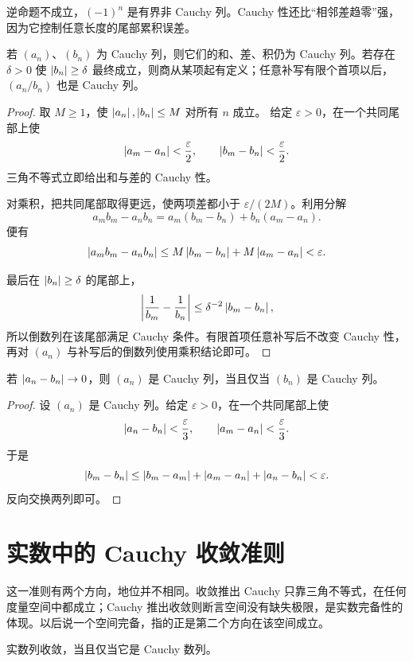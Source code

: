逆命题不成立，\((-1)^n\) 是有界非 Cauchy 列。Cauchy 性还比“相邻差趋零”强，因为它控制任意长度的尾部累积误差。

\begin{proposition}
若 \((a_n)\)、\((b_n)\) 为 Cauchy 列，则它们的和、差、积仍为 Cauchy 列。若存在 \(\delta>0\) 使
\(\left|b_n\right|\ge\delta\) 最终成立，则商从某项起有定义；任意补写有限个首项以后，\((a_n/b_n)\) 也是 Cauchy 列。
\end{proposition}

\begin{proof}
取 \(M\ge1\)，使 \(\left|a_n\right|,\left|b_n\right|\le M\) 对所有 \(n\) 成立。
给定 \(\varepsilon>0\)，在一个共同尾部上使
\[
 \left|a_m-a_n\right|<\frac{\varepsilon}{2},
 \qquad
 \left|b_m-b_n\right|<\frac{\varepsilon}{2}.
\]
三角不等式立即给出和与差的 Cauchy 性。

对乘积，把共同尾部取得更远，使两项差都小于
\(\varepsilon/(2M)\)。利用分解
\[
 a_mb_m-a_nb_n=a_m(b_m-b_n)+b_n(a_m-a_n).
\]
便有
\[
 \left|a_mb_m-a_nb_n\right|
 \le M\left|b_m-b_n\right|+M\left|a_m-a_n\right|<\varepsilon.
\]

最后在 \(\left|b_n\right|\ge\delta\) 的尾部上，
\[
 \left|\frac1{b_m}-\frac1{b_n}\right|
 \le\delta^{-2}\left|b_m-b_n\right|,
\]
所以倒数列在该尾部满足 Cauchy 条件。有限首项任意补写后不改变
Cauchy 性，再对 \((a_n)\) 与补写后的倒数列使用乘积结论即可。
\end{proof}

\begin{proposition}
若 \(\left|a_n-b_n\right|\to0\)，则 \((a_n)\) 是 Cauchy 列，当且仅当
\((b_n)\) 是 Cauchy 列。
\end{proposition}

\begin{proof}
设 \((a_n)\) 是 Cauchy 列。给定 \(\varepsilon>0\)，在一个共同尾部上使
\[
 \left|a_n-b_n\right|<\frac{\varepsilon}{3},
 \qquad
 \left|a_m-a_n\right|<\frac{\varepsilon}{3}.
\]
于是
\[
 \left|b_m-b_n\right|
 \le\left|b_m-a_m\right|+\left|a_m-a_n\right|+\left|a_n-b_n\right|
 <\varepsilon.
\]
反向交换两列即可。
\end{proof}

\section{实数中的 Cauchy 收敛准则}

这一准则有两个方向，地位并不相同。收敛推出 Cauchy 只靠三角不等式，在任何度量空间中都成立；Cauchy 推出收敛则断言空间没有缺失极限，是实数完备性的体现。以后说一个空间完备，指的正是第二个方向在该空间成立。


\begin{theorem}
实数列收敛，当且仅当它是 Cauchy 数列。
\end{theorem}

